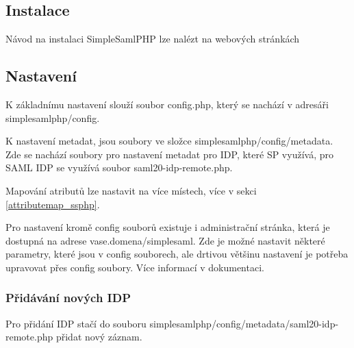 \subsection{Instalace}
Návod na instalaci SimpleSamlPHP lze nalézt na webových stránkách %

\subsection{Nastavení} %
K základnímu nastavení slouží soubor config.php, který se nachází v adresáři simplesamlphp/config.

K nastavení metadat, jsou soubory ve složce simplesamlphp/config/metadata. Zde se nachází soubory pro nastavení metadat pro IDP, které SP využívá, pro SAML IDP se využívá soubor saml20-idp-remote.php.

Mapování atributů lze nastavit na více místech, více v sekci \ref{attributemap_ssphp}.

Pro nastavení kromě config souborů existuje i administrační stránka, která je dostupná na adrese vase.domena/simplesaml. Zde je možné nastavit některé parametry, které jsou v config souborech, ale drtivou většinu nastavení je potřeba upravovat přes config soubory.
Více informací v dokumentaci. %

\subsubsection{Přidávání nových IDP} %

Pro přidání IDP stačí do souboru simplesamlphp/config/metadata/saml20-idp-remote.php přidat nový záznam.

